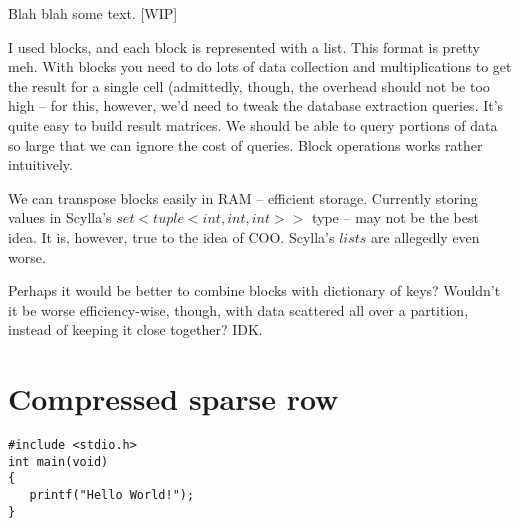 \documentclass{article}
\begin{document}
Blah blah some text. [WIP]

I used blocks, and each block is represented with a list.
This format is pretty meh. With blocks you need to do lots of data collection and multiplications to get the result for a single cell (admittedly, though, the overhead should not be too high – for this, however, we'd need to tweak the database extraction queries. It's quite easy to build result matrices. We should be able to query portions of data so large that we can ignore the cost of queries. Block operations works rather intuitively. 

We can transpose blocks easily in RAM – efficient storage.
Currently storing values in Scylla's $set<tuple<int, int, int>>$ type – may not be the best idea. It is, however, true to the idea of COO. Scylla's $lists$ are allegedly even worse.

Perhaps it would be better to combine blocks with dictionary of keys? Wouldn't it be worse efficiency-wise, though, with data scattered all over a partition, instead of keeping it close together? IDK.

\pagebreak
\section{Compressed sparse row}


\begin{lstlisting}[style=CStyle]
#include <stdio.h>
int main(void)
{
   printf("Hello World!"); 
}
\end{lstlisting}
\end{document}
